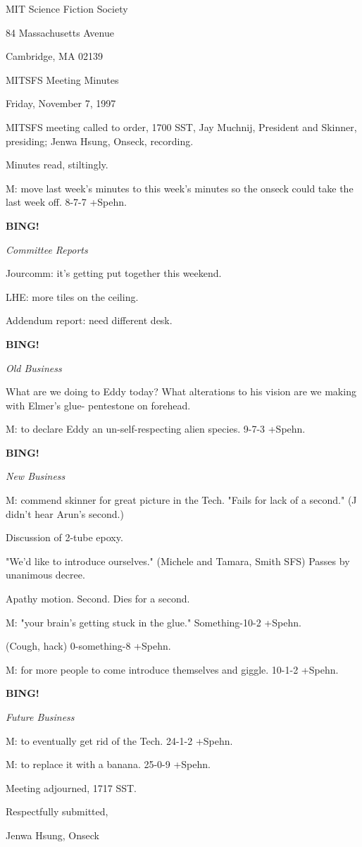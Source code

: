 \documentclass[12pt]{article}
\newcommand{\bing}{{\bf BING!} }
\newcommand{\goto}[1]{\bing \vskip 12pt \centerline{{\em{#1}}}}
\begin{document}
\begin{center}

MIT Science Fiction Society 

84 Massachusetts Avenue

Cambridge, MA 02139

\vspace{12pt}

MITSFS Meeting Minutes 

Friday, November 7, 1997

\end{center}
 
\vspace{18pt}

\setlength{\parskip}{6pt}

\noindent
MITSFS meeting called to order, 1700 SST,
Jay Muchnij, President and Skinner, presiding; Jenwa Hsung, Onseck, recording.

Minutes read, stiltingly.

M: move last week's minutes to this week's minutes so the onseck could take the last week off. 8-7-7 +Spehn.

\goto{Committee Reports}

Jourcomm: it's getting put together this weekend.

LHE: more tiles on the ceiling.

Addendum report: need different desk.

\goto{Old Business}

What are we doing to Eddy today? What alterations to his vision are we making with Elmer's glue- pentestone on forehead.

M: to declare Eddy an un-self-respecting alien species. 9-7-3 +Spehn.

\goto{New Business}

M: commend skinner for great picture in the Tech. "Fails for lack of a second." (J didn't hear Arun's second.)

Discussion of 2-tube epoxy.

"We'd like to introduce ourselves." (Michele and Tamara, Smith SFS) Passes by unanimous decree.

Apathy motion. Second. Dies for a second.

M: "your brain's getting stuck in the glue." Something-10-2 +Spehn.

(Cough, hack) 0-something-8 +Spehn.

M: for more people to come introduce themselves and giggle. 10-1-2 +Spehn.

\goto{Future Business}

M: to eventually get rid of the Tech. 24-1-2 +Spehn.

M: to replace it with a banana. 25-0-9 +Spehn.

\vspace{12pt}

\noindent
Meeting adjourned, 1717 SST.

\vspace{18pt}

\centerline{Respectfully submitted,}
\centerline{Jenwa Hsung, Onseck}
\end{document}

